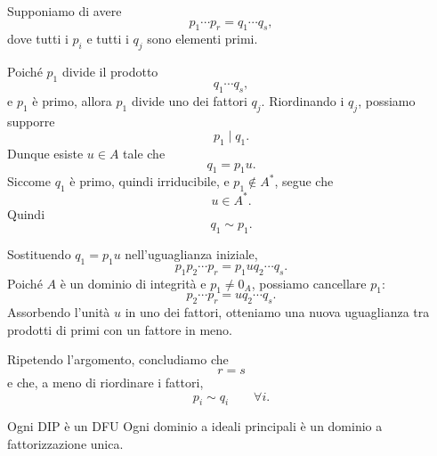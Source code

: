 \documentclass[a4paper]{article}
\begin{document}
\begin{radioactive}
\begin{snippetproof}{}
    Supponiamo di avere
    \[
        p_1\cdots p_r=q_1\cdots q_s,
    \]
    dove tutti i \(p_i\) e tutti i \(q_j\) sono elementi primi.

    Poiché \(p_1\) divide il prodotto
    \[
        q_1\cdots q_s,
    \]
    e \(p_1\) è primo, allora \(p_1\) divide uno dei fattori \(q_j\).
    Riordinando i \(q_j\), possiamo supporre
    \[
        p_1\mid q_1.
    \]
    Dunque esiste \(u\in A\) tale che
    \[
        q_1=p_1u.
    \]
    Siccome \(q_1\) è primo, quindi irriducibile, e \(p_1\notin A^\ast\), segue che
    \[
        u\in A^\ast.
    \]
    Quindi
    \[
        q_1\sim p_1.
    \]

    Sostituendo \(q_1=p_1u\) nell'uguaglianza iniziale,
    \[
        p_1p_2\cdots p_r=p_1u q_2\cdots q_s.
    \]
    Poiché \(A\) è un dominio di integrità e \(p_1\neq 0_A\), possiamo cancellare \(p_1\):
    \[
        p_2\cdots p_r=uq_2\cdots q_s.
    \]
    Assorbendo l'unità \(u\) in uno dei fattori, otteniamo una nuova uguaglianza tra prodotti di primi con un fattore in meno.

    Ripetendo l'argomento, concludiamo che
    \[
        r=s
    \]
    e che, a meno di riordinare i fattori,
    \[
        p_i\sim q_i
        \qquad
        \forall i.
    \]
\end{snippetproof}
\end{radioactive}

\begin{radioactive}
\begin{snippettheorem}{Ogni DIP è un DFU}
    Ogni dominio a ideali principali è un dominio a fattorizzazione unica.
\end{snippettheorem}
\end{radioactive}
\end{document}
